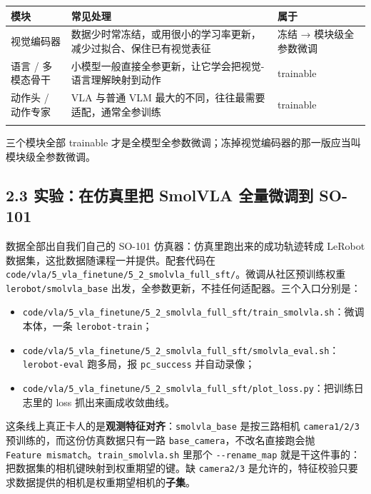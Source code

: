 \documentclass[
  chinese,
]{ctexart}
\providecommand{\tightlist}{%
  \setlength{\itemsep}{0pt}\setlength{\parskip}{0pt}}
\begin{document}
\begin{center}
\begin{tabular}{@{}>{\raggedright\arraybackslash}p{} >{\raggedright\arraybackslash}p{} >{\raggedright\arraybackslash}p{}@{}}
\toprule\noalign{}
模块 & 常见处理 & 属于 \\
\midrule\noalign{}
视觉编码器 & 数据少时常冻结，或用很小的学习率更新，减少过拟合、保住已有视觉表征 & 冻结 → 模块级全参数微调 \\
语言 / 多模态骨干 & 小模型一般直接全参更新，让它学会把视觉-语言理解映射到动作 & trainable \\
动作头 / 动作专家 & VLA 与普通 VLM 最大的不同，往往最需要适配，通常全参训练 & trainable \\
\bottomrule\noalign{}
\end{tabular}
\end{center}

三个模块全部 trainable
才是全模型全参数微调；冻掉视觉编码器的那一版应当叫模块级全参数微调。

\subsection{2.3 实验：在仿真里把 SmolVLA 全量微调到
SO-101}\label{ux5b9eux9a8cux5728ux4effux771fux91ccux628a-smolvla-ux5168ux91cfux5faeux8c03ux5230-so-101}

数据全部出自我们自己的 SO-101 仿真器：仿真里跑出来的成功轨迹转成 LeRobot
数据集，这批数据随课程一并提供。配套代码在
\texttt{code/vla/5\_vla\_finetune/5\_2\_smolvla\_full\_sft/}。微调从社区预训练权重
\texttt{lerobot/smolvla\_base}
出发，全参数更新，不挂任何适配器。三个入口分别是：

\begin{itemize}
\tightlist
\item
  \texttt{code/vla/5\_vla\_finetune/5\_2\_smolvla\_full\_sft/train\_smolvla.sh}：微调本体，一条
  \texttt{lerobot-train}；
\item
  \texttt{code/vla/5\_vla\_finetune/5\_2\_smolvla\_full\_sft/smolvla\_eval.sh}：\texttt{lerobot-eval}
  跑多局，报 \texttt{pc\_success} 并自动录像；
\item
  \texttt{code/vla/5\_vla\_finetune/5\_2\_smolvla\_full\_sft/plot\_loss.py}：把训练日志里的
  loss 抓出来画成收敛曲线。
\end{itemize}

这条线上真正卡人的是\textbf{观测特征对齐}：\texttt{smolvla\_base}
是按三路相机 \texttt{camera1/2/3} 预训练的，而这份仿真数据只有一路
\texttt{base\_camera}，不改名直接跑会抛
\texttt{Feature\ mismatch}。\texttt{train\_smolvla.sh} 里那个
\texttt{-\/-rename\_map}
就是干这件事的：把数据集的相机键映射到权重期望的键。缺
\texttt{camera2/3}
是允许的，特征校验只要求数据提供的相机是权重期望相机的\textbf{子集}。
\end{document}
